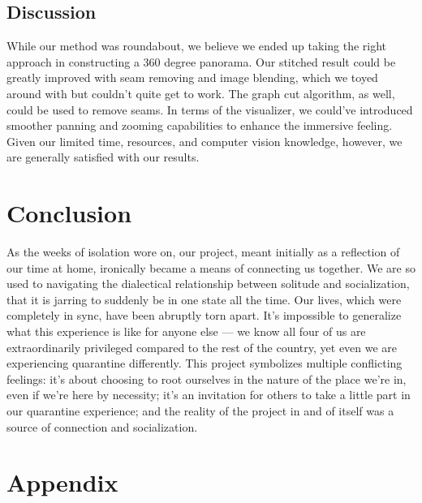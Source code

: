 \documentclass[10pt,twocolumn,letterpaper]{article}
\begin{document}
\subsection{Discussion}

While our method was roundabout, we believe we ended up taking the right approach in constructing a 360 degree panorama. Our stitched result could be greatly improved with seam removing and image blending, which we toyed around with but couldn't quite get to work. The graph cut algorithm, as well, could be used to remove seams. In terms of the visualizer, we could've introduced smoother panning and zooming capabilities to enhance the immersive feeling. Given our limited time, resources, and computer vision knowledge, however, we are generally satisfied with our results.

\section{Conclusion}

As the weeks of isolation wore on, our project, meant initially as a reflection of our time at home, ironically became a means of connecting us together. We are so used to navigating the dialectical relationship between solitude and socialization, that it is jarring to suddenly be in one state all the time. Our lives, which were completely in sync, have been abruptly torn apart. It's impossible to generalize what this experience is like for anyone else — we know all four of us are extraordinarily privileged compared to the rest of the country, yet even we are experiencing quarantine differently. This project symbolizes multiple conflicting feelings: it's about choosing to root ourselves in the nature of the place we're in, even if we're here by necessity; it's an invitation for others to take a little part in our quarantine experience; and the reality of the project in and of itself was a source of connection and socialization.

{\small


}

\section*{Appendix}
\end{document}
